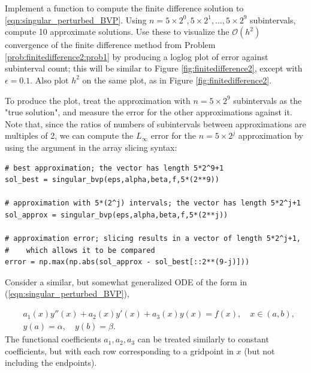 \begin{problem}
Implement a function  to compute the finite difference solution to \ref{eqn:singular_perturbed_BVP}.
Using $n = 5 \times 2^0,5 \times 2^1, \dots ,5 \times 2^9$ subintervals, compute 10 approximate solutions. 
Use these to visualize the $\mathcal{O}(h^2)$ convergence of the finite difference method from Problem \ref{prob:finitedifference2:prob1} by producing a loglog plot of error against subinterval count; this will be similar to Figure \ref{fig:finitedifference2}, except with $\epsilon=0.1$. Also plot $h^2$ on the same plot, as in Figure \ref{fig:finitedifference2}.

To produce the plot, treat the approximation with $n = 5 \times 2^9$ subintervals as the "true solution", and measure the error for the other approximations against it. Note that, since the ratios of numbers of subintervals between approximations are multiples of 2, we can compute the $L_{\infty}$ error for the $n=5 \times 2^j$ approximation by using the  argument in the array slicing syntax:
\begin{lstlisting}
# best approximation; the vector has length 5*2^9+1
sol_best = singular_bvp(eps,alpha,beta,f,5*(2**9))

# approximation with 5*(2^j) intervals; the vector has length 5*2^j+1
sol_approx = singular_bvp(eps,alpha,beta,f,5*(2**j))

# approximation error; slicing results in a vector of length 5*2^j+1,
#    which allows it to be compared
error = np.max(np.abs(sol_approx - sol_best[::2**(9-j)]))
\end{lstlisting}
\end{problem}

Consider a similar, but somewhat generalized ODE of the form in (\ref{eqn:singular_perturbed_BVP}),

\begin{align*}
	&{ } a_1(x)y''(x) +a_2(x)y'(x) +a_3(x)y(x) = f(x), \quad x \in (a,b),\\
	&{ } y(a) = \alpha, \quad y(b) = \beta.
\end{align*}
The functional coefficients $a_1, a_2, a_3$ can be treated similarly to constant coefficients, but with each row corresponding to a gridpoint in $x$ (but not including the endpoints).

